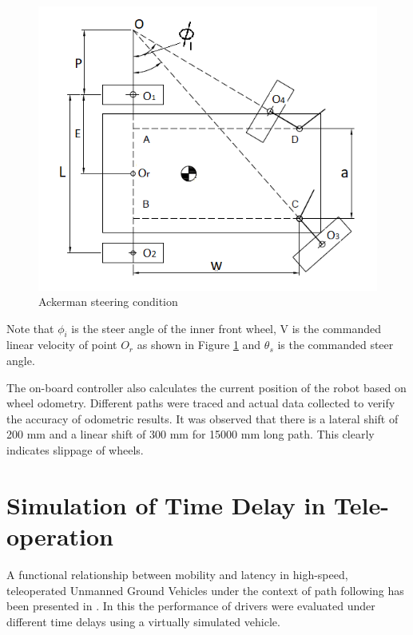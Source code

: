 \documentclass[12pt,a4paper, notitlepage]{article}
\begin{document}
\begin{figure}[ht]
	\centering
	\includegraphics[width=4.5in]{fig/kinvec} 
	\caption{Ackerman steering condition}\label{fig:KenVec}
\end{figure}
Note that $\phi_{i}$ is the steer angle of the inner front wheel, V is the commanded linear velocity of point $O_r$ as shown in Figure \ref{fig:KenVec} and $\theta_s$ is the commanded steer angle. 


The on-board controller also calculates the current position of the robot based on wheel odometry. Different paths were traced and actual data collected to verify the accuracy of odometric results. It was observed that there is a lateral shift of 200 mm and a linear shift of 300 mm for 15000 mm long path. This clearly indicates slippage of wheels. 

\section{Simulation of Time Delay in Tele-operation}
 A functional relationship between mobility and latency in high-speed, teleoperated Unmanned Ground Vehicles under the context of path following has been presented in \cite{gorsich2018evaluating}. In this the  performance of  drivers were  evaluated under different time delays using a virtually simulated vehicle. 
 
\end{document}
